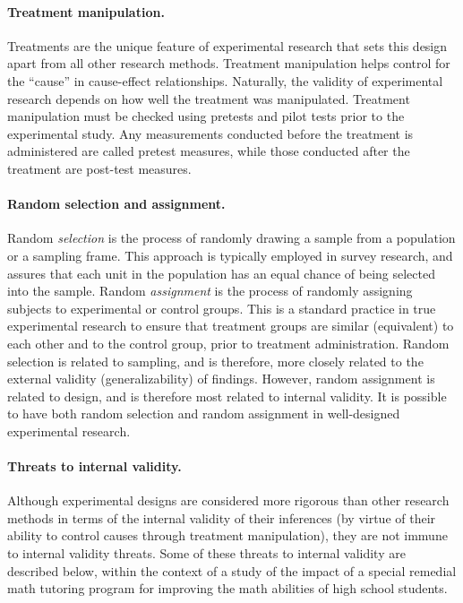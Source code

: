 \paragraph{Treatment manipulation.} Treatments are the unique feature of experimental research that sets this design apart from all other research methods. Treatment manipulation helps control for the ``cause'' in cause-effect relationships. Naturally, the validity of experimental research depends on how well the treatment was manipulated. Treatment manipulation must be checked using pretests and pilot tests prior to the experimental study. Any measurements conducted before the treatment is administered are called pretest measures, while those conducted after the treatment are post-test measures. 

\paragraph{Random selection and assignment.} Random \textit{selection} is the process of randomly drawing a sample from a population or a sampling frame. This approach is typically employed in survey research, and assures that each unit in the population has an equal chance of being selected into the sample. Random \textit{assignment} is the process of randomly assigning subjects to experimental or control groups. This is a standard practice in true experimental research to ensure that treatment groups are similar (equivalent) to each other and to the control group, prior to treatment administration. Random selection is related to sampling, and is therefore, more closely related to the external validity (generalizability) of findings. However, random assignment is related to design, and is therefore most related to internal validity. It is possible to have both random selection and random assignment in well-designed experimental research.

\paragraph{Threats to internal validity.} Although experimental designs are considered more rigorous than other research methods in terms of the internal validity of their inferences (by virtue of their ability to control causes through treatment manipulation), they are not immune to internal validity threats. Some of these threats to internal validity are described below, within the context of a study of the impact of a special remedial math tutoring program for improving the math abilities of high school students.

